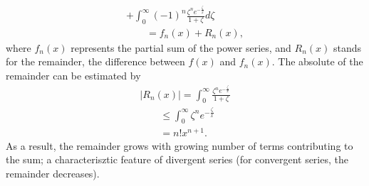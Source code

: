 {\begin{equation}
\begin{array}{l}
 +
\int_0^\infty (-1)^n \frac{\zeta^ne^{-\frac{\zeta}{x}}}{1+\zeta}
d\zeta  \\
\qquad =
f_n(x)  +R_n(x),
\end{array}
\label{2011-m-ch-dsee17}
\end{equation}
where $f_n(x)$ represents the partial sum of the power series, and $R_n(x)$ stands for the remainder,
the difference between $f(x)$ and $f_n(x)$.
The absolute of the remainder can be estimated by
\begin{equation}
\begin{array}{l}
\vert R_n(x)\vert
=
\int_0^\infty  \frac{\zeta^n e^{-\frac{\zeta}{x}}}{1+\zeta}\\
\qquad \le
\int_0^\infty  \zeta^n e^{-\frac{\zeta}{x}} \\
\qquad = n! x^{n+1}.
\end{array}
\label{2011-m-ch-dsee18}
\end{equation}
As a result, the remainder grows with growing number of terms contributing to the sum;
a characterisztic feature of divergent series (for convergent series, the remainder decreases).

\eproof
}

\begin{center}
{\color{olive}   \Huge
 \floweroneright
}
\end{center}
